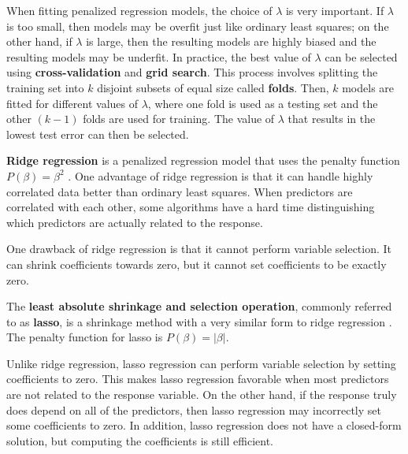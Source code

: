 \documentclass{article}
\begin{document}
When fitting penalized regression models, the choice of $\lambda$ is very important. If $\lambda$ is too small, then models may be overfit just like ordinary least squares; on the other hand, if $\lambda$ is large, then the resulting models are highly biased and the resulting models may be underfit. In practice, the best value of $\lambda$ can be selected using \textbf{cross-validation} and \textbf{grid search}. This process involves splitting the training set into $k$ disjoint subsets of equal size called \textbf{folds}. Then, $k$ models are fitted for different values of $\lambda$, where one fold is used as a testing set and the other $(k - 1)$ folds are used for training. The value of $\lambda$ that results in the lowest test error can then be selected.

\textbf{Ridge regression} is a penalized regression model that uses the penalty function $P(\beta) = \beta^2$ \cite{hoerl1970ridge}. One advantage of ridge regression is that it can handle highly correlated data better than ordinary least squares. When predictors are correlated with each other, some algorithms have a hard time distinguishing which predictors are actually related to the response.

One drawback of ridge regression is that it cannot perform variable selection. It can shrink coefficients towards zero, but it cannot set coefficients to be exactly zero.

The \textbf{least absolute shrinkage and selection operation}, commonly referred to as \textbf{lasso}, is a shrinkage method with a very similar form to ridge regression \cite{tibshirani1996regression, james2013introduction}. The penalty function for lasso is $P(\beta) = \vert \beta \vert$.

Unlike ridge regression, lasso regression can perform variable selection by setting coefficients to zero. This makes lasso regression favorable when most predictors are not related to the response variable. On the other hand, if the response truly does depend on all of the predictors, then lasso regression may incorrectly set some coefficients to zero. In addition, lasso regression does not have a closed-form solution, but computing the coefficients is still efficient.
\end{document}
